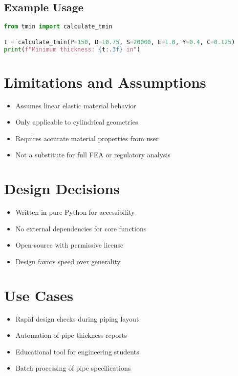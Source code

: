\documentclass[11pt]{article}
\begin{document}
\subsection*{Example Usage}
\begin{lstlisting}[language=Python]
from tmin import calculate_tmin

t = calculate_tmin(P=150, D=10.75, S=20000, E=1.0, Y=0.4, C=0.125)
print(f"Minimum thickness: {t:.3f} in")
\end{lstlisting}

\section{Limitations and Assumptions}
\begin{itemize}
    \item Assumes linear elastic material behavior
    \item Only applicable to cylindrical geometries
    \item Requires accurate material properties from user
    \item Not a substitute for full FEA or regulatory analysis
\end{itemize}

\section{Design Decisions}
\begin{itemize}
    \item Written in pure Python for accessibility
    \item No external dependencies for core functions
    \item Open-source with permissive license
    \item Design favors speed over generality
\end{itemize}

\section{Use Cases}
\begin{itemize}
    \item Rapid design checks during piping layout
    \item Automation of pipe thickness reports
    \item Educational tool for engineering students
    \item Batch processing of pipe specifications
\end{itemize}
\end{document}
